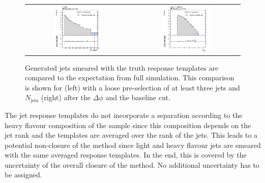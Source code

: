 \begin{figure}[hbtp]
  \centering
  \begin{tabular}{cc}
                \includegraphics[width=0.47\textwidth]{figures/HT_presel_madgraph_DR53X_chs_TuneZ2star_SmearedGenJets_withoutPUReweighting_v1.png} &
                \includegraphics[width=0.47\textwidth]{figures/NJets_baseline_withoutMHT_madgraph_DR53X_chs_TuneZ2star_SmearedGenJets_withoutPUReweighting_v1.png} 
  \end{tabular}
  \caption{Generated jets smeared with the truth response templates are compared to the expectation from full simulation. This comparison is shown for \HT (left) with a loose pre-selection of at least three jets and $N_{\text{jets}}$ (right) after the $\Delta \phi$ and the baseline \HT cut.}
  \label{fig:qcd_rs_genjets}
\end{figure}

The jet response templates do not incorporate a separation according to the heavy flavour composition of the sample since this composition depends on the jet rank and the templates are averaged over the rank of the jets. This leads to a potential non-closure of the method since light and heavy flavour jets are smeared with the same averaged response templates. In the end, this is covered by the uncertainty of the overall closure of the method. No additional uncertainty has to be assigned.

